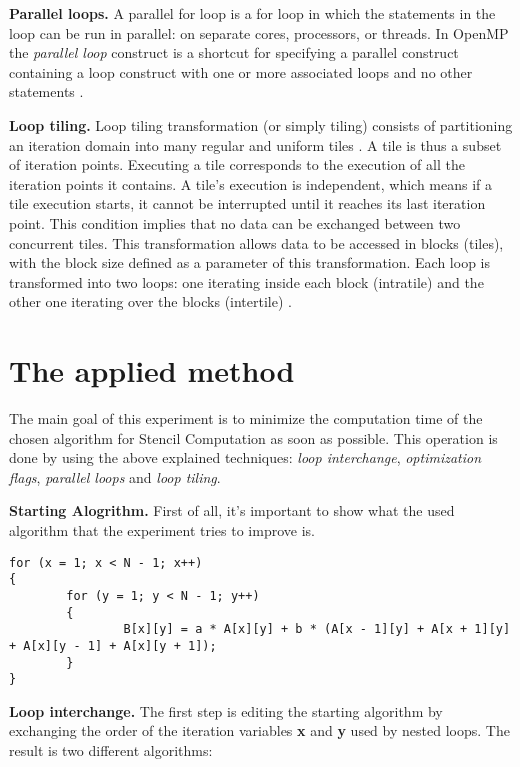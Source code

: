 \documentclass[conference]{IEEEtran}
\newcommand{\mypar}[1]{{\bf #1.}}
\begin{document}
\mypar{Parallel loops}
A parallel for loop is a for loop in which the statements in the loop can be run in parallel: on separate cores, processors, or threads. 
In OpenMP the \textit{parallel loop} construct is a shortcut for specifying a parallel construct containing a loop construct with one or more associated loops and no other statements \cite{omp-parallel}. 

\mypar{Loop tiling}
Loop tiling transformation (or simply tiling) consists of partitioning an iteration domain into many regular and uniform tiles \cite{barigou}. A tile is thus a subset of iteration points. Executing a tile corresponds to the execution of all the iteration points it contains. A tile's execution is independent, which means if a tile execution starts, it cannot be interrupted until it reaches its last iteration point. This condition implies that no data can be exchanged between two concurrent tiles. This transformation allows data to be accessed in blocks (tiles), with the block size defined as a parameter of this transformation. Each loop is transformed into two loops: one iterating inside each block (intratile) and the other one iterating over the blocks (intertile) \cite{loop-tiling}. 

\section{The applied method}\label{sec:yourmethod}

The main goal of this experiment is to minimize the computation time of the chosen algorithm for Stencil Computation as soon as possible. This operation is done by using the above explained techniques: \textit{loop interchange}, \textit{optimization flags}, \textit{parallel loops} and \textit{loop tiling}.

\mypar{Starting Alogrithm}
First of all, it's important to show what the used algorithm that the experiment tries to improve is.
\begin{lstlisting}
for (x = 1; x < N - 1; x++)
{
		for (y = 1; y < N - 1; y++)
		{
				B[x][y] = a * A[x][y] + b * (A[x - 1][y] + A[x + 1][y] + A[x][y - 1] + A[x][y + 1]);
		}
}
\end{lstlisting}

\mypar{Loop interchange}
The first step is editing the starting algorithm by exchanging the order of the iteration variables \textbf{x} and \textbf{y} used by nested loops. The result is two different algorithms:

\setcounter{lstlisting}{0}
\renewcommand{\lstlistingname}{Algorithm}
\end{document}
